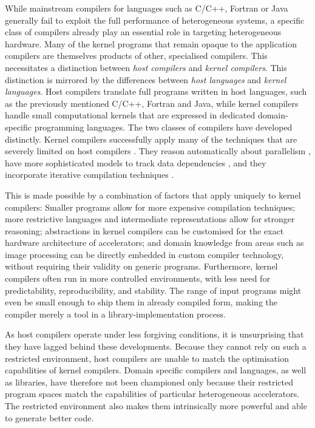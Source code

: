     While mainstream compilers for languages such as C/C++, Fortran or Java
    generally fail to exploit the full performance of heterogeneous systems, a
    specific class of compilers already play an essential role in
    targeting heterogeneous hardware.
    Many of the kernel programs that remain opaque to the application compilers
    are themselves products of other, specialised compilers.
    This necessitates a distinction between {\em host compilers} and {\em kernel
    compilers}.
    This distinction is mirrored by the differences between {\em host languages}
    and {\em kernel languages}.
    Host compilers translate full programs written in host languages,
    such as the previously mentioned C/C++, Fortran and Java, while kernel
    compilers handle small computational kernels that are expressed in dedicated
    domain-specific programming languages.
    The two classes of compilers have developed distinctly.
    Kernel compilers successfully apply many of the techniques that are severely
    limited on host compilers
    \citep{Murphy2014LimitsOD,Maleki:2011:EVC:2120965.2121464}.
    They reason automatically about parallelism
    \citep{Steuwer:2017:LFD:3049832.3049841}, have more sophisticated models to
    track data dependencies \citep{Baghdadi:2019:TPC:3314872.3314896}, and they
    incorporate iterative compilation techniques
    \citep{Ansel:2014:OEF:2628071.2628092}.

    This is made possible by a combination of factors that apply uniquely to
    kernel compilers:
    Smaller programs allow for more expensive compilation techniques;
    more restrictive languages and intermediate representations allow for
    stronger reasoning;
    abstractions in kernel compilers can be customised for the exact hardware
    architecture of accelerators;
    and domain knowledge from areas such as image processing can be directly
    embedded in custom compiler technology, without requiring their validity
    on generic programs.
    Furthermore, kernel compilers often run in more controlled environments,
    with less need for predictability, reproducibility, and stability.
    The range of input programs might even be small enough to ship them in
    already compiled form, making the compiler merely a tool in a
    library-implementation process.

    As host compilers operate under less forgiving conditions, it is
    unsurprising that they have lagged behind these developments.
    Because they cannot rely on such a restricted environment, host compilers
    are unable to match the optimisation capabilities of kernel compilers.
    Domain specific compilers and languages, as well as libraries, have
    therefore not been championed only because their restricted program
    spaces match the capabilities of particular heterogeneous accelerators.
    The restricted environment also makes them intrinsically more powerful and
    able to generate better code.

